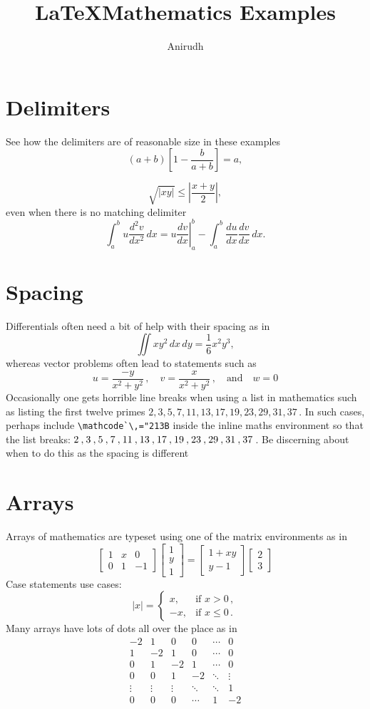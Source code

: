 \documentclass[20pt,a4paper]{extarticle}
\title{\LaTeX Mathematics Examples}
\author{Anirudh}
\begin{document}
\maketitle
\tableofcontents
\section{Delimiters}
See how the delimiters are of reasonable size in these examples\\
\[
(a+b)\left[1-\frac{b}{a+b}\right]=a,
\]

\[
\sqrt{|xy|}\leq\left|\frac{x+y}{2}\right|,
\]
even when there is no matching delimiter
\[
\int_a^bu\frac{d^2v}{dx^2}\,dx
=\left.u\frac{dv}{dx}\right|_a^b
-\int_a^b\frac{du}{dx}\frac{dv}{dx}\,dx.
\]
\section{Spacing}
Differentials often need a bit of help with their spacing as in
\[
\iint xy^2\,dx\,dy 
=\frac{1}{6}x^2y^3,
\]
whereas vector problems often lead to statements such as
\[
	u=\frac{-y}{x^2+y^2}\,, \quad v=\frac{x}{x^2+y^2}\,, \quad \text{and}\quad w=0
\]
Occasionally one gets horrible line breaks when using a list in mathematics such as listing the first twelve primes \(2,3,5,7,11,13,17,19,23,29,31,37\)\,.
In such cases, perhaps include \verb|\mathcode`\,="213B| inside the inline maths environment so that the list breaks:
\(\mathcode`\,="213B 2,3,5,7,11,13,17,19,23,29,31,37\)\,.
Be discerning about when to do this as the spacing is different
\section{Arrays}

Arrays of mathematics are typeset using one of the matrix environments as 
in
\[
\begin{bmatrix}
1 & x & 0 \\
0 & 1 & -1
\end{bmatrix}\begin{bmatrix}
1  \\
y  \\
1
\end{bmatrix}
=\begin{bmatrix}
1+xy  \\
y-1
\end{bmatrix}\begin{bmatrix}
2\\
3
\end{bmatrix}
\]
Case statements use cases:
\[
|x|=\begin{cases}
x, & \text{if }x>0\,,  \\
-x, & \text{if }x\leq 0\,.
\end{cases}
\]
Many arrays have lots of dots all over the place as in
\[
\begin{matrix}
-2 & 1 & 0 & 0 & \cdots & 0  \\
1 & -2 & 1 & 0 & \cdots & 0  \\
0 & 1 & -2 & 1 & \cdots & 0  \\
0 & 0 & 1 & -2 & \ddots & \vdots \\
\vdots & \vdots & \vdots & \ddots & \ddots & 1  \\
0 & 0 & 0 & \cdots & 1 & -2
\end{matrix}
\]
\end{document}
